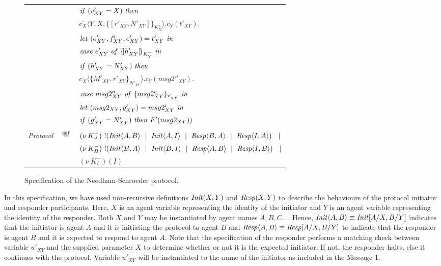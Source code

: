 \documentclass[10pt,a4paper,final,oneside,fleqn]{book}
\newcommand*{\eqdef}{\mathbin{\mathop{=}\limits^{\texttt{def}}}}
\begin{document}
\begin{figure}[!tbp]
\begin{center}
\begin{tabular}{|lll|}
&&$\mbox{{\itshape if\/} }(v'_{XY}=X)\mbox{ {\itshape then\/}}$\\
&&$\overline{c_{X}}\langle Y,X,\{\![r'_{XY},N'_{XY}]\!\}_{K^+_{X}}\rangle.c_{Y}(t'_{XY}).$\\
&&$\mbox{{\itshape let\/} }(o'_{XY},f'_{XY},e'_{XY})=t'_{XY}\mbox{ {\itshape in\/}}$\\&&
$\mbox{{\itshape case\/} }e'_{XY}\mbox{ {\itshape of\/} }\{\![h'_{XY}]\!\}_{K^-_{Y}}\mbox{ {\itshape in\/}}$\\
&&$\mbox{{\itshape if\/} }(h'_{XY}=N'_{XY})\mbox{ {\itshape then\/}}$\\
&&$\overline{c_{X}}\langle\{M'_{XY},r'_{XY}\}_{N'_{XY}}\rangle.c_{Y}(msg2''_{XY}).$\\
&&$\mbox{{\itshape case\/} }msg2''_{XY}\mbox{ {\itshape of\/} }\{msg2'_{XY}\}_{r'_{XY}}\mbox{ {\itshape in\/}}$\\
&&$\mbox{{\itshape let\/} }(msg2_{XY},g'_{XY})=msg2'_{XY}\mbox{ {\itshape in\/}}$\\
&&$\mbox{{\itshape if\/} }(g'_{XY}=N'_{XY})\mbox{ {\itshape then\/} }F'(msg2_{XY}))$\\&&\\
{\itshape Protocol\/}&$\eqdef$&$(\nu~\!K^-_{A})~!(\mbox{{\itshape Init\/}}\langle A,B\rangle~\mid~\mbox{{\itshape Init\/}}\langle A,I\rangle~\mid~\mbox{{\itshape Resp\/}}\langle B,A\rangle~\mid~\mbox{{\itshape Resp\/}}\langle I,A\rangle)~~\mid$\\
&&$(\nu~\!K^-_{B})~!(\mbox{{\itshape Init\/}}\langle B,A\rangle~\mid~\mbox{{\itshape Init\/}}\langle B,I\rangle~\mid~\mbox{{\itshape Resp\/}}\langle A,B\rangle~\mid~\mbox{{\itshape Resp\/}}\langle I,B\rangle)~~\mid$\\
&&$(\nu~\!K^-_I)(I)$\\
\hline
\end{tabular}
\end{center}
\caption{Specification of the Needham-Schroeder protocol.\label{need}}
\end{figure}
In this specification, we have used non-recursive definitions $\mbox{{\itshape Init\/}}(X,Y)$ and $\mbox{{\itshape Resp\/}}(X,Y)$ to describe the behaviours of the protocol initiator and responder participants. Here, $X$ is an agent variable representing the identity of the initiator and $Y$ is an agent variable representing the identity of the responder.  Both $X$ and $Y$ may be instantiated by agent names $A,B,C\ldots$.  Hence, $\mbox{{\itshape Init\/}}\langle A,B\rangle\equiv\mbox{{\itshape Init\/}}[A/X,B/Y]$ indicates that the initiator is agent $A$ and it is initiating the protocol to agent $B$ and $\mbox{{\itshape Resp\/}}\langle A,B\rangle\equiv\mbox{{\itshape Resp\/}}[A/X,B/Y]$ to indicate that the responder is agent $B$ and it is expected to respond to agent $A$. Note that the specification of the responder performs a matching check between variable $u'_{XY}$ and the supplied parameter $X$ to determine whether or not it is the expected initiator. If not, the responder halts, else it continues with the protocol.  Variable $u'_{XY}$ will be instantiated to the name of the initiator as included in the Message 1.
\end{document}
